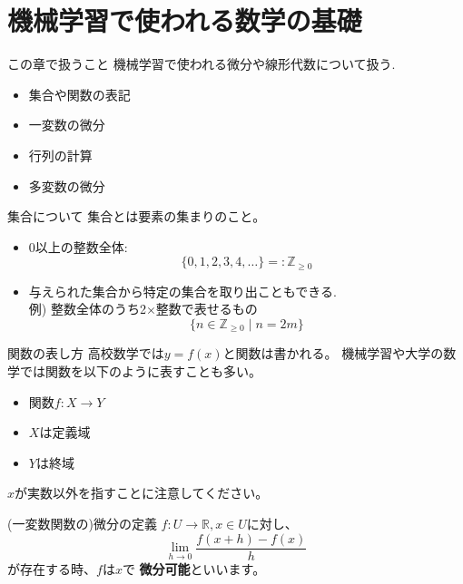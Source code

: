 \section{機械学習で使われる数学の基礎}

\begin{frame}{この章で扱うこと}
機械学習で使われる微分や線形代数について扱う.
\begin{itemize}
\item 集合や関数の表記
\item 一変数の微分
\item 行列の計算
\item 多変数の微分
\end{itemize}
\end{frame}


\begin{frame}{集合について}
集合とは要素の集まりのこと。
\begin{itemize}
\item  0以上の整数全体: 
\begin{equation*}
\{0, 1, 2, 3, 4, \ldots \} =: \mathbb{Z}_{\ge 0}
\end{equation*}
\item 与えられた集合から特定の集合を取り出こともできる. \\
       例) 整数全体のうち2×整数で表せるもの 
\begin{equation*}
\{n \in \mathbb{Z}_{\ge 0} \mid n = 2m \}
\end{equation*}
\end{itemize}
\end{frame}

\begin{frame}{関数の表し方}
高校数学では$y = f(x)$と関数は書かれる。 
機械学習や大学の数学では関数を以下のように表すことも多い。
\begin{itemize}
\item 関数$f: X \to Y$
\item $X$は定義域
\item $Y$は終域
\end{itemize}
$x$が実数以外を指すことに注意してください。
\end{frame}

\begin{frame}{(一変数関数の)微分の定義}
$f:U \to \mathbb{R}, x \in U$に対し、
  \begin{equation*}
   \lim_{h \to 0} \frac{f(x+h) - f(x)}{h}
\end{equation*}
が存在する時、$f$は$x$で \textbf{微分可能}といいます。
\end{frame}


